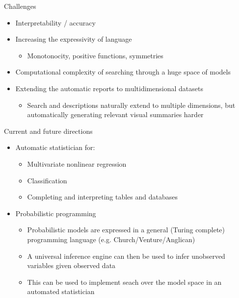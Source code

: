 \begin{frame}{Challenges}
  \begin{itemize}
    \item Interpretability / accuracy
    \vspace{\baselineskip}
    \item Increasing the expressivity of language
    \begin{itemize}
      \item \eg Monotonocity, positive functions, symmetries
    \end{itemize}
    \vspace{\baselineskip}
    \item Computational complexity of searching through a huge space of models
    \vspace{\baselineskip}
    \item Extending the automatic reports to multidimensional datasets
    \begin{itemize}
      \item Search and descriptions naturally extend to multiple dimensions, but automatically generating relevant visual summaries harder 
    \end{itemize}
  \end{itemize}
\end{frame}

\begin{frame}{Current and future directions}
  \begin{itemize}
    \item Automatic statistician for:
    \begin{itemize}
      \item Multivariate nonlinear regression
      \item Classification
      \item Completing and interpreting tables and databases
    \end{itemize}
    \vspace{\baselineskip}
    \item Probabilistic programming
    \begin{itemize}
      \item Probabilistic models are expressed in a general (Turing complete) programming
language (e.g. Church/Venture/Anglican)
      \item A universal inference engine can then be used to infer unobserved variables
given observed data
      \item This can be used to implement seach over the model space in an automated
statistician
    \end{itemize}
  \end{itemize}
\end{frame}

